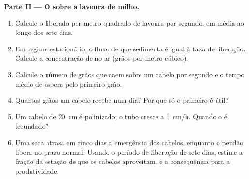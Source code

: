 \begin{problem}
\medskip
\noindent\textbf{Parte II --- O  sobre a lavoura de milho.}
\begin{enumerate}[resume]
  \item Calcule o  liberado por metro quadrado de lavoura por
        segundo, em média ao longo dos sete dias.
  \item Em regime estacionário, o fluxo de  que sedimenta é igual
        à taxa de liberação. Calcule a concentração de  no ar
        (grãos por metro cúbico).
  \item Calcule o número de grãos que caem sobre um cabelo por segundo
        e o tempo médio de espera pelo primeiro grão.
  \item Quantos grãos um cabelo recebe num dia? Por que só o primeiro é
        útil?
  \item Um cabelo de \qty{20}{cm} é polinizado; o tubo cresce a
        \qty{1}{cm/h}. Quando o  é fecundado?
  \item Uma seca atrasa em cinco dias a emergência dos cabelos,
        enquanto o pendão libera  no prazo normal. Usando o período
        de liberação de sete dias, estime a fração da estação de 
        que os cabelos aproveitam, e a consequência para a
        produtividade.
\end{enumerate}


\end{problem}
